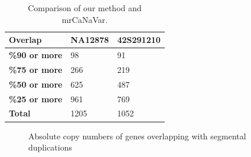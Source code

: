 \begin{table}[!htbp]
    \centering
    \begin{tabular}{lll}
    \hline
    \textbf{Overlap}             & \textbf{NA12878} & \textbf{42S291210}   \\ \hline
    \textbf{\%90 or more} & 98      & 91   \\
    \textbf{\%75 or more} & 266     & 219  \\
    \textbf{\%50 or more} & 625     & 487  \\
    \textbf{\%25 or more} & 961      & 769   \\ \hline
    \textbf{Total}        & 1205    & 1052 \\ \hline
    \end{tabular}
    \caption{Comparison of our method and mrCaNaVar.}
    \label{overlapTable}
\end{table}


\begin{figure}
    \centering
    \quad
    \caption{Absolute copy numbers of genes overlapping with segmental duplications}
    \label{unfiltered}
\end{figure}

